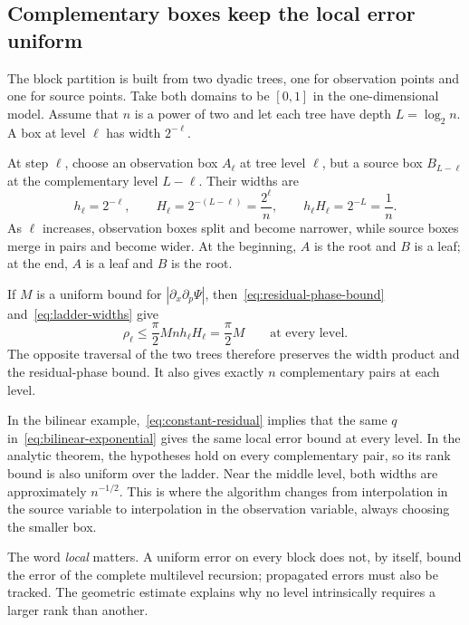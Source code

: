 \subsection{Complementary boxes keep the local error uniform}
\label{subsec:complementary-boxes}

The block partition is built from two dyadic trees, one for observation points and one for source points. Take both domains to be $[0,1]$ in the one-dimensional model. Assume that $n$ is a power of two and let each tree have depth $L=\log_2 n$. A box at level $\ell$ has width $2^{-\ell}$.

At step $\ell$, choose an observation box $A_\ell$ at tree level $\ell$, but a source box $B_{L-\ell}$ at the complementary level $L-\ell$. Their widths are
\begin{equation}
    h_\ell=2^{-\ell},
    \qquad
    H_\ell=2^{-(L-\ell)}=\frac{2^\ell}{n},
    \qquad
    h_\ell H_\ell=2^{-L}=\frac1n.
    \label{eq:ladder-widths}
\end{equation}
As $\ell$ increases, observation boxes split and become narrower, while source boxes merge in pairs and become wider. At the beginning, $A$ is the root and $B$ is a leaf; at the end, $A$ is a leaf and $B$ is the root.

If $M$ is a uniform bound for $|\partial_x\partial_p\Psi|$, then~\eqref{eq:residual-phase-bound} and~\eqref{eq:ladder-widths} give
\begin{equation}
    \rho_\ell
    \leq \frac{\pi}{2}M n h_\ell H_\ell
    =\frac{\pi}{2}M
    \qquad\text{at every level}.
    \label{eq:constant-residual}
\end{equation}
The opposite traversal of the two trees therefore preserves the width product and the residual-phase bound. It also gives exactly $n$ complementary pairs at each level.

In the bilinear example,~\eqref{eq:constant-residual} implies that the same $q$ in~\eqref{eq:bilinear-exponential} gives the same local error bound at every level. In the analytic theorem, the hypotheses hold on every complementary pair, so its rank bound is also uniform over the ladder. Near the middle level, both widths are approximately $n^{-1/2}$. This is where the algorithm changes from interpolation in the source variable to interpolation in the observation variable, always choosing the smaller box.

The word \emph{local} matters. A uniform error on every block does not, by itself, bound the error of the complete multilevel recursion; propagated errors must also be tracked. The geometric estimate explains why no level intrinsically requires a larger rank than another.

